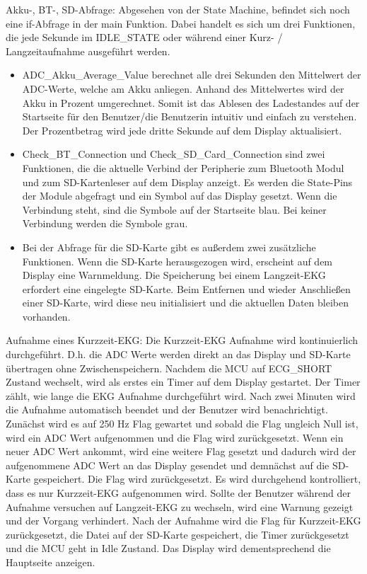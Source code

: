 Akku-, BT-, SD-Abfrage: Abgesehen von der State Machine, befindet sich noch eine if-Abfrage in der main Funktion. Dabei handelt es sich um drei Funktionen, die jede Sekunde im IDLE\_STATE oder während einer Kurz- / Langzeitaufnahme ausgeführt werden.
\begin{itemize}
    \item ADC\_Akku\_Average\_Value berechnet alle drei Sekunden den Mittelwert der ADC-Werte, welche am Akku anliegen. Anhand des Mittelwertes wird der Akku in Prozent umgerechnet. Somit ist das Ablesen des Ladestandes auf der Startseite für den Benutzer/die Benutzerin intuitiv und einfach zu verstehen.
    Der Prozentbetrag wird jede dritte Sekunde auf dem Display aktualisiert.
    \item Check\_BT\_Connection und Check\_SD\_Card\_Connection sind zwei Funktionen, die die aktuelle Verbind der Peripherie zum Bluetooth Modul und zum SD-Kartenleser auf dem Display anzeigt. Es werden die State-Pins der Module abgefragt und ein Symbol auf das Display gesetzt. Wenn die Verbindung steht, sind die Symbole auf der Startseite blau. Bei keiner Verbindung werden die Symbole grau.
    \item Bei der Abfrage für die SD-Karte gibt es außerdem zwei zusätzliche Funktionen. Wenn die SD-Karte herausgezogen wird, erscheint auf dem Display eine Warnmeldung. Die Speicherung bei einem Langzeit-EKG erfordert eine eingelegte SD-Karte. Beim Entfernen und wieder Anschließen einer SD-Karte, wird diese neu initialisiert und die aktuellen Daten bleiben vorhanden.
\end{itemize}

Aufnahme eines Kurzzeit-EKG: Die Kurzzeit-EKG Aufnahme wird kontinuierlich durchgeführt. D.h. die ADC Werte werden direkt an das Display und SD-Karte übertragen ohne Zwischenspeichern. Nachdem die MCU auf ECG\_SHORT Zustand wechselt, wird als erstes ein Timer auf dem Display gestartet. Der Timer zählt, wie lange die EKG Aufnahme durchgeführt wird. Nach zwei Minuten wird die Aufnahme automatisch beendet und der Benutzer wird benachrichtigt. Zunächst wird es auf 250 Hz Flag gewartet und sobald die Flag ungleich Null ist, wird ein ADC Wert aufgenommen und die Flag wird zurückgesetzt. Wenn ein neuer ADC Wert ankommt, wird eine weitere Flag gesetzt und dadurch wird der aufgenommene ADC Wert an das Display gesendet und demnächst auf die SD-Karte gespeichert. Die Flag wird zurückgesetzt.
Es wird durchgehend kontrolliert, dass es nur Kurzzeit-EKG aufgenommen wird. Sollte der Benutzer während der Aufnahme versuchen auf Langzeit-EKG zu wechseln, wird eine Warnung gezeigt und der Vorgang verhindert.
Nach der Aufnahme wird die Flag für Kurzzeit-EKG zurückgesetzt, die Datei auf der SD-Karte gespeichert, die Timer zurückgesetzt und die MCU geht in Idle Zustand. Das Display wird dementsprechend die Hauptseite anzeigen.

